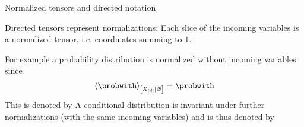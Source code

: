 \documentclass{beamer}
\begin{document}
    \begin{frame}{Normalized tensors and directed notation}

        Directed tensors represent normalizations: Each slice of the incoming variables is a normalized tensor, i.e. coordinates summing to $1$.

        For example a probability distribution is normalized without incoming variables since
        \begin{align*}
            \normalizationof{\probwith}{\shortcatvariables}
            = \probwith
        \end{align*}
        This is denoted by
        A conditional distribution is invariant under further normalizations (with the same incoming variables) and is thus denoted by
    \end{frame}
\end{document}
